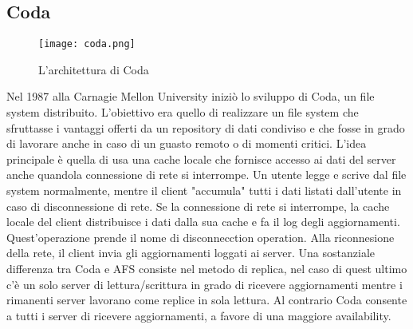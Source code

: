 \subsection{Coda}
\begin{figure}[ht]
  \begin{center}
    \texttt{[image: coda.png]}
    \caption{L'architettura di Coda}
    \label{hyp}
  \end{center}
\end{figure}
Nel 1987 alla Carnagie Mellon University iniziò lo sviluppo di Coda, un file system distribuito. L'obiettivo era quello di realizzare un file system che sfruttasse i vantaggi offerti da un repository di dati condiviso e che fosse in grado di lavorare anche in caso di un guasto remoto o di momenti critici. L'idea principale è quella di usa una cache locale che fornisce accesso ai dati del server anche quandola connessione di rete si interrompe. Un utente legge e scrive dal file system normalmente, mentre il client "accumula" tutti i dati listati dall'utente in caso di disconnessione di rete.
Se la connessione di rete si interrompe, la cache locale del client distribuisce i dati dalla sua cache e fa il log degli aggiornamenti. Quest'operazione prende il nome di disconnecction operation. Alla riconnesione della rete, il client invia gli aggiornamenti loggati ai server. Una sostanziale differenza tra Coda e AFS consiste nel metodo di replica, nel caso di quest ultimo c'è un solo server di lettura/scrittura in grado di ricevere aggiornamenti mentre i rimanenti server lavorano come replice in sola lettura. Al contrario Coda consente a tutti i server di ricevere aggiornamenti, a favore di una maggiore availability.

